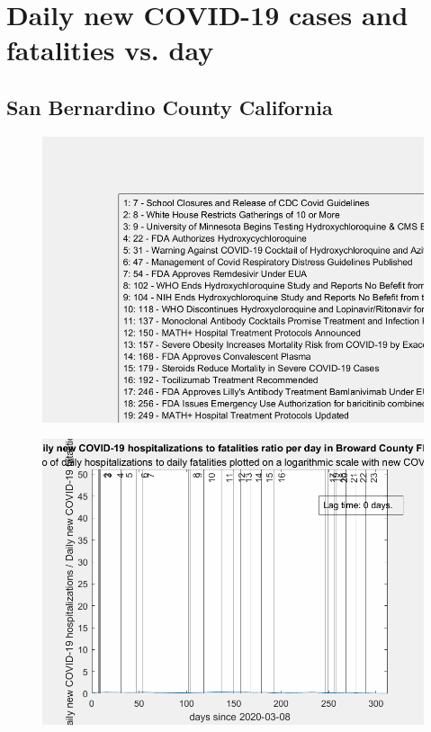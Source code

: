 \documentclass[12pt]{article}
\begin{document}
\FloatBarrier


\section{Daily new COVID-19 cases and fatalities vs. day}

\subsection[subtitle]{San Bernardino County California}

\begin{figure}[!h]
	\includegraphics[width=\linewidth]{legends/TreatmentLegend.png}
	\caption{}
	\label{fig:legends/TreatmentLegendLabel}
\end{figure}

\begin{figure}[!h]
	\includegraphics[width=\linewidth]{images/broward_hospitalization_fatalities_ratio-0lag.png}
	\caption{}
	\label{fig:images/broward_hospitalization_fatalities_ratio-0lagLabel}
\end{figure}
\end{document}
